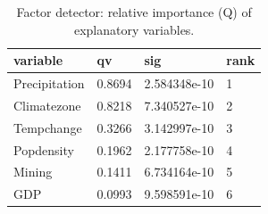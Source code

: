 \begin{table}[t]\centering
\caption{Factor detector: relative importance (Q) of explanatory variables.}\label{tab:factor}
\begin{tabular}{llll}
\hline
variable & qv & sig & rank \\
\hline
Precipitation & 0.8694 & 2.584348e-10 & 1 \\
Climatezone & 0.8218 & 7.340527e-10 & 2 \\
Tempchange & 0.3266 & 3.142997e-10 & 3 \\
Popdensity & 0.1962 & 2.177758e-10 & 4 \\
Mining & 0.1411 & 6.734164e-10 & 5 \\
GDP & 0.0993 & 9.598591e-10 & 6 \\
\hline
\end{tabular}\end{table}
